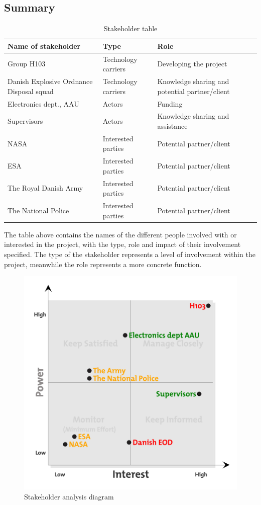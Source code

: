 \subsection{Summary}
\begin{table}[H]
	\begin{tabular}{ | p{5cm} | l | p{5cm} |}
	   	\hline
	   	\bfseries Name of stakeholder & \bfseries Type & \bfseries Role \\ \hline
	   	Group H103 & Technology carriers & Developing the project \\ \hline
	   	Danish Explosive Ordnance Disposal squad & Technology carriers & Knowledge sharing and potential partner/client  \\ \hline
	   	Electronics dept., AAU & Actors & Funding\\ \hline
	   	Supervisors & Actors & Knowledge sharing and assistance \\ \hline
 	   	NASA & Interested parties & Potential partner/client \\ \hline
 	   	ESA & Interested parties & Potential partner/client \\ \hline
 	   	The Royal Danish Army & Interested parties & Potential partner/client \\ \hline
 	   	The National Police & Interested parties & Potential partner/client \\
	   	\hline
	\end{tabular}
	\caption{Stakeholder table}
	\label{table:stakeholdertable}
\end{table}

The table above contains the names of the different people involved with or interested in the project, with the type, role and impact of their involvement specified. The type of the stakeholder represents a level of involvement within the project, meanwhile the role represents a more concrete function.

\begin{figure}[H]
	\centering
	\includegraphics[scale=.6]{images/stakeholderanalysis.png}
	\caption{Stakeholder analysis diagram}
	\label{fig:stakeholder}
\end{figure}

